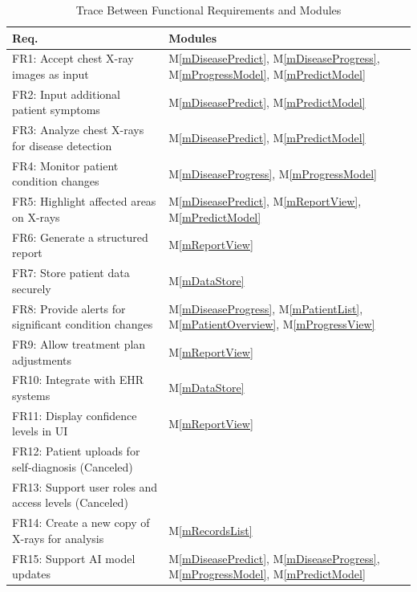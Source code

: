 \documentclass[12pt, titlepage]{article}
\newcommand{\mref}[1]{M\ref{#1}}
\begin{document}
\begin{table}[H]
\centering
\begin{tabular}{p{} p{}}
\toprule
\textbf{Req.} & \textbf{Modules}\\
\midrule
FR1: Accept chest X-ray images as input & \mref{mDiseasePredict}, \mref{mDiseaseProgress}, \mref{mProgressModel}, \mref{mPredictModel}\\
FR2: Input additional patient symptoms & \mref{mDiseasePredict}, \mref{mPredictModel}\\
FR3: Analyze chest X-rays for disease detection & \mref{mDiseasePredict}, \mref{mPredictModel}\\
FR4: Monitor patient condition changes & \mref{mDiseaseProgress}, \mref{mProgressModel}\\
FR5: Highlight affected areas on X-rays & \mref{mDiseasePredict}, \mref{mReportView}, \mref{mPredictModel}\\
FR6: Generate a structured report & \mref{mReportView}\\
FR7: Store patient data securely & \mref{mDataStore}\\
FR8: Provide alerts for significant condition changes & \mref{mDiseaseProgress}, \mref{mPatientList}, \mref{mPatientOverview}, \mref{mProgressView}\\
FR9: Allow treatment plan adjustments & \mref{mReportView}\\
FR10: Integrate with EHR systems & \mref{mDataStore}\\
FR11: Display confidence levels in UI & \mref{mReportView}\\
FR12: Patient uploads for self-diagnosis (Canceled) & \\
FR13: Support user roles and access levels (Canceled) & \\
FR14: Create a new copy of X-rays for analysis & \mref{mRecordsList}\\
FR15: Support AI model updates & \mref{mDiseasePredict}, \mref{mDiseaseProgress}, \mref{mProgressModel}, \mref{mPredictModel}\\
\bottomrule
\end{tabular}
\caption{Trace Between Functional Requirements and Modules}
\label{TblRT}
\end{table}
\end{document}
